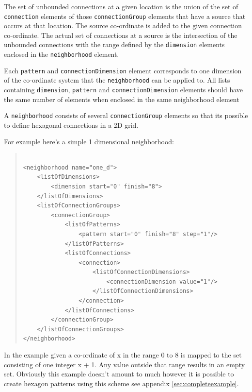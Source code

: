 \documentclass[10pt]{article}
\newcommand{\tightspacing}{\renewcommand{\baselinestretch}{0.85}}
\newcommand{\regularspacing}{\renewcommand{\baselinestretch}{1.0}}
\newcommand{\class}[1]{\texttt{#1}}
\begin{document}
The set of unbounded connections at a given location is the union
of the set of \class{connection} elements of those
\class{connectionGroup} elements that have a source that occurs
at that location. The source co-ordinate is added to the given
connection co-ordinate.  The actual set of connections at a
source is the intersection of the unbounded connections with the
range defined by the \class{dimension} elements enclosed in the
\class{neighborhood} element.

Each \class{pattern} and \class{connectionDimension} element
corresponds to one dimension of the co-ordinate system that the
\class{neighborhood} can be applied to. All lists containing
\class{dimension}, \class{pattern} and
\class{connectionDimension} elements should have the same number
of elements when enclosed in the same neighborhood element

A \class{neighborhood} consists of several
\class{connectionGroup} elements so that its possible to define
hexagonal connections in a 2D grid.

For example here's a simple 1 dimensional neighborhood:
\begin{quote}
  \begin{small}
    \tightspacing

\begin{verbatim}

<neighborhood name="one_d">
    <listOfDimensions>
        <dimension start="0" finish="8">
    </listOfDimensions>
    <listOfConnectionGroups>
        <connectionGroup>
            <listOfPatterns>
                <pattern start="0" finish="8" step="1"/>
            </listOfPatterns>
            <listOfConnections>
                <connection>
                    <listOfConnectionDimensions>
                        <connectionDimension value="1"/>
                    </listOfConnectionDimensions>
                </connection>
            </listOfConnections>
        </connectionGroup>
    </listOfConnectionGroups>
</neighborhood>

\end{verbatim}

    \regularspacing
  \end{small}
\end{quote}

In the example given a co-ordinate of x in the range 0 to 8 is
mapped to the set consisting of one integer x + 1. Any value
outside that range results in an empty set.  Obviously this
example doesn't amount to much however it is possible to create
hexagon patterns using this scheme see appendix \ref{sec:completeexample}.
\end{document}
